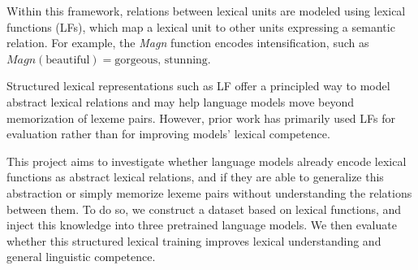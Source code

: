 \documentclass[11pt]{article}
\begin{document}
Within this framework, relations between lexical units are modeled using
lexical functions (LFs), which map a lexical unit to other units expressing a
semantic relation. For example, the \textit{Magn} function encodes
intensification, such as $Magn(\text{beautiful}) = \text{gorgeous, stunning}$.


Structured lexical representations such as LF offer a principled way to model
abstract lexical relations and may help language models move beyond
memorization of lexeme pairs. However, prior work has primarily used LFs for
evaluation rather than for improving models' lexical competence.




This project aims to investigate whether language models already encode lexical
functions as abstract lexical relations, and if they are able to
generalize this abstraction or simply memorize lexeme pairs without
understanding the relations between them. To do so, we construct a dataset
based on lexical functions, and inject this knowledge into three pretrained
language models. We then evaluate whether this structured lexical training
improves lexical understanding and general linguistic competence.

\end{document}
